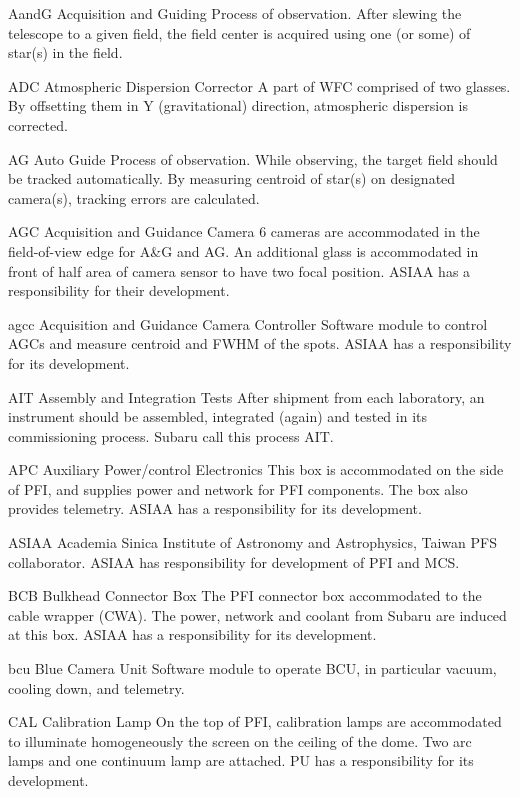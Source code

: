 
{AandG}
{Acquisition and Guiding}
{Process of observation. After slewing the telescope to a given field, the field center is acquired using one (or some) of star(s) in the field.}


{ADC}
{Atmospheric Dispersion Corrector}
{A part of WFC comprised of two glasses. By offsetting them in Y (gravitational) direction, atmospheric dispersion is corrected.}


{AG}
{Auto Guide}
{Process of observation. While observing, the target field should be tracked automatically. By measuring centroid of star(s) on designated camera(s), tracking errors are calculated.}


{AGC}
{Acquisition and Guidance Camera}
{6 cameras are accommodated in the field-of-view edge for A\&G and AG. An additional glass is accommodated in front of half area of camera sensor to have two focal position. ASIAA has a responsibility for their development.}


{agcc}
{Acquisition and Guidance Camera Controller}
{Software module to control AGCs and measure centroid and FWHM of the spots. ASIAA has a responsibility for its development.}


{AIT}
{Assembly and Integration Tests}
{After shipment from each laboratory, an instrument should be assembled, integrated (again) and tested in its commissioning process. Subaru call this process AIT.}


{APC}
{Auxiliary Power/control Electronics}
{This box is accommodated on the side of PFI, and supplies power and network for PFI components. The box also provides telemetry. ASIAA has a responsibility for its development.}


{ASIAA}
{Academia Sinica Institute of Astronomy and Astrophysics, Taiwan}
{PFS collaborator. ASIAA has responsibility for development of PFI and MCS.}


{BCB}
{Bulkhead Connector Box}
{The PFI connector box accommodated to the cable wrapper (CWA). The power, network and coolant from Subaru are induced at this box. ASIAA has a responsibility for its development.}


{bcu}
{Blue Camera Unit}
{Software module to operate BCU, in particular vacuum, cooling down, and telemetry.}


{CAL}
{Calibration Lamp}
{On the top of PFI, calibration lamps are accommodated to illuminate homogeneously the screen on the ceiling of the dome. Two arc lamps and one continuum lamp are attached. PU has a responsibility for its development.}


